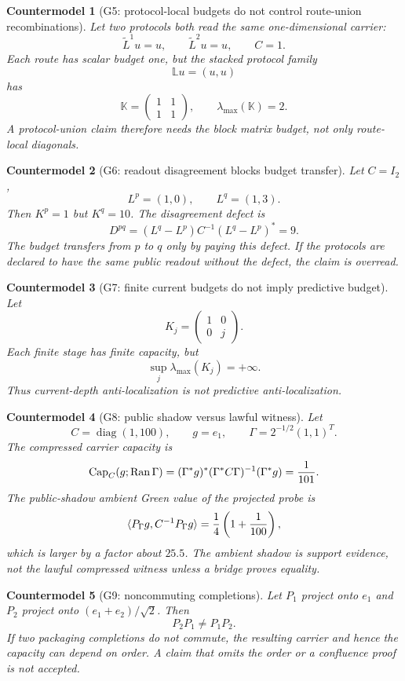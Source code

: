 \documentclass[11pt]{article}
\newtheorem{countermodel}{Countermodel}
\newcommand{\Ran}{\operatorname{Ran}}
\newcommand{\ALCap}{\operatorname{Cap}}
\begin{document}
\begin{countermodel}[G5: protocol-local budgets do not control route-union recombinations]
Let two protocols both read the same one-dimensional carrier:
\[
  \widetilde L^1u=u,
  \qquad
  \widetilde L^2u=u,
  \qquad C=1.
\]
Each route has scalar budget one, but the stacked protocol family
\[
  \mathbb L u=(u,u)
\]
has
\[
  \mathbb K=\begin{pmatrix}1&1\\1&1\end{pmatrix},
  \qquad \lambda_{\max}(\mathbb K)=2.
\]
A protocol-union claim therefore needs the block matrix budget, not only route-local diagonals.
\end{countermodel}

\begin{countermodel}[G6: readout disagreement blocks budget transfer]
Let \(C=I_2\),
\[
  L^p=(1,0),\qquad L^q=(1,3).
\]
Then \(K^p=1\) but \(K^q=10\).  The disagreement defect is
\[
  D^{pq}=(L^q-L^p)C^{-1}(L^q-L^p)^*=9.
\]
The budget transfers from \(p\) to \(q\) only by paying this defect.  If the protocols are declared to have the same public readout without the defect, the claim is overread.
\end{countermodel}

\begin{countermodel}[G7: finite current budgets do not imply predictive budget]
Let
\[
  K_j=\begin{pmatrix}1&0\\0&j\end{pmatrix}.
\]
Each finite stage has finite capacity, but
\[
  \sup_j \lambda_{\max}(K_j)=+\infty.
\]
Thus current-depth anti-localization is not predictive anti-localization.
\end{countermodel}

\begin{countermodel}[G8: public shadow versus lawful witness]
Let
\[
  C=\operatorname{diag}(1,100),
  \qquad g=e_1,
  \qquad \Gamma=2^{-1/2}(1,1)^T.
\]
The compressed carrier capacity is
\[
  \ALCap_C(g;\Ran\Gamma)=
  (\Gamma^*g)^*(\Gamma^*C\Gamma)^{-1}(\Gamma^*g)
  ={1\over 101}.
\]
The public-shadow ambient Green value of the projected probe is
\[
  \langle P_\Gamma g,C^{-1}P_\Gamma g\rangle
  ={1\over 4}\left(1+{1\over100}\right),
\]
which is larger by a factor about \(25.5\).  The ambient shadow is support evidence, not the lawful compressed witness unless a bridge proves equality.
\end{countermodel}

\begin{countermodel}[G9: noncommuting completions]
Let \(P_1\) project onto \(e_1\) and \(P_2\) project onto \((e_1+e_2)/\sqrt2\).  Then
\[
  P_2P_1\ne P_1P_2.
\]
If two packaging completions do not commute, the resulting carrier and hence the capacity can depend on order.  A claim that omits the order or a confluence proof is not accepted.
\end{countermodel}
\end{document}

